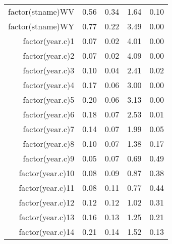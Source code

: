 \begin{table}[ht]
\begin{tabular}{rrrrr}
  factor(stname)WV & 0.56 & 0.34 & 1.64 & 0.10 \\ 
  factor(stname)WY & 0.77 & 0.22 & 3.49 & 0.00 \\ 
  factor(year.c)1 & 0.07 & 0.02 & 4.01 & 0.00 \\ 
  factor(year.c)2 & 0.07 & 0.02 & 4.09 & 0.00 \\ 
  factor(year.c)3 & 0.10 & 0.04 & 2.41 & 0.02 \\ 
  factor(year.c)4 & 0.17 & 0.06 & 3.00 & 0.00 \\ 
  factor(year.c)5 & 0.20 & 0.06 & 3.13 & 0.00 \\ 
  factor(year.c)6 & 0.18 & 0.07 & 2.53 & 0.01 \\ 
  factor(year.c)7 & 0.14 & 0.07 & 1.99 & 0.05 \\ 
  factor(year.c)8 & 0.10 & 0.07 & 1.38 & 0.17 \\ 
  factor(year.c)9 & 0.05 & 0.07 & 0.69 & 0.49 \\ 
  factor(year.c)10 & 0.08 & 0.09 & 0.87 & 0.38 \\ 
  factor(year.c)11 & 0.08 & 0.11 & 0.77 & 0.44 \\ 
  factor(year.c)12 & 0.12 & 0.12 & 1.02 & 0.31 \\ 
  factor(year.c)13 & 0.16 & 0.13 & 1.25 & 0.21 \\ 
  factor(year.c)14 & 0.21 & 0.14 & 1.52 & 0.13 \\ 
   \hline
\end{tabular}
\end{table}

